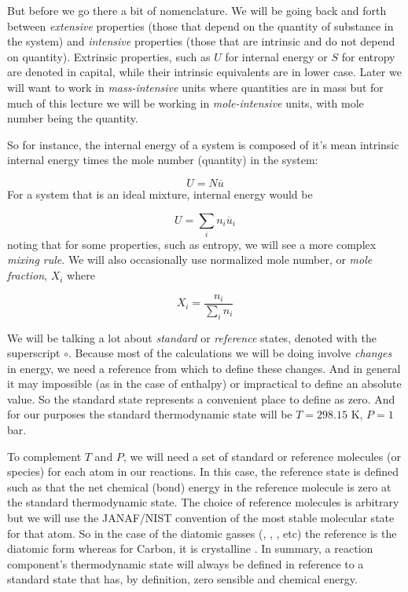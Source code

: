 \documentclass[twocolumn]{memoir} %
\begin{document}
But before we go there a bit of nomenclature.  We will be going back and forth between \emph{extensive}
properties (those that depend on the quantity of substance in the system) and \emph{intensive} properties
(those that are intrinsic and do not depend on quantity).  Extrinsic properties, such as $U$ for internal
energy or $S$ for entropy are denoted in capital, while their intrinsic equivalents are in lower case.
Later we will want to work in \emph{mass-intensive} units where quantities are in mass but for much of
this lecture we will be working in \emph{mole-intensive} units, with mole number being the quantity.

So for instance, the internal energy of a system is composed of it's mean intrinsic internal energy
times the mole number (quantity) in the system:

\begin{equation}
    U = N \overline{u}
\end{equation}
%
For a system that is an ideal mixture, internal energy would be

\begin{equation}
    U = \sum_i n_i \overline{u}_i
\end{equation}
%
noting that for some properties, such as entropy, we will see a more complex \emph{mixing rule}.
We will also occasionally use normalized mole number, or \emph{mole fraction}, $X_i$ where

\begin{equation}
    X_i = \frac{n_i}{\sum\limits_{i}n_i}
\end{equation}

We will be talking a lot about \emph{standard} or \emph{reference}
states, denoted with the superscript $\circ$.  Because most of the calculations we will be doing involve
\emph{changes} in energy, we need a reference from which to define these changes.  And in general it may 
impossible (as in the case of enthalpy) or impractical to define an absolute value.
So the standard state represents a convenient place to define as zero.  And for our purposes the standard 
thermodynamic state will be $T = 298.15$ K, $P = 1$ bar.  

To complement $T$ and $P$, we will need a set of standard or reference molecules (or species) for each atom in our reactions.  In this case, 
the reference state is defined such as that the net chemical (bond) energy in the reference molecule 
is zero at the standard thermodynamic state.  The choice of reference molecules is arbitrary but we will use
the JANAF/NIST convention of
the most stable molecular state for that atom.  So in the case of the diatomic gasses (, ,
, etc) the reference is the diatomic form whereas for Carbon, it is crystalline .
In summary, a reaction component's thermodynamic state will always be defined in reference to a standard
state that has, by definition, zero sensible and chemical energy.
\end{document}
